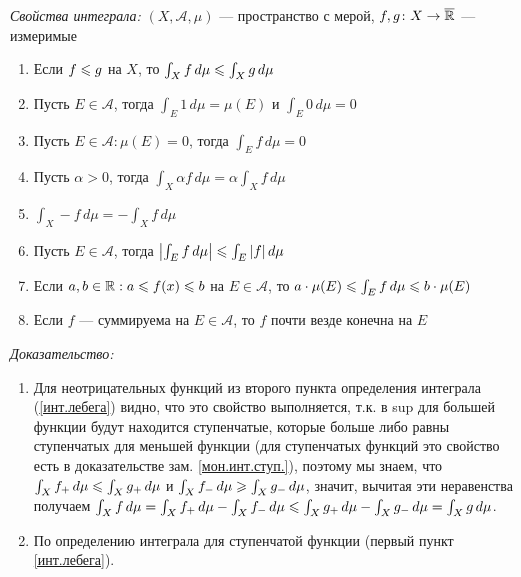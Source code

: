 \begin{zam}[https://www.youtube.com/live/fVyBKDoy3EM?si=LgENIvc4Pq6wo4Vq&t=7600] \textit{Свойства интеграла:} $(X, \mathcal A, \mu)$ --- пространство с мерой, $f, g\colon X \to \overline{\mathbb R}$ --- измеримые\
\begin{enumerate}\makeatletter\renewcommand{\p@enumi}{\thezam.}\makeatother
	\item\label{мон.инт.} Если $f \leqslant g$ на $X$, то $\int_X f \, d\mu \leqslant \int_X g \, d\mu$
	
	\item Пусть $E \in \mathcal A$, тогда $\int_E 1 \, d\mu = \mu(E)$ и $\int_E 0 \, d\mu = 0$
	
	\item Пусть $E \in \mathcal A : \mu(E) = 0$, тогда $\int_E f \, d\mu = 0$
	
	\item Пусть $\alpha > 0$, тогда $\int_X \alpha f \, d\mu = \alpha \int_X f \, d\mu$
	
	\item $\int_X -f \, d\mu = -\int_X f \, d\mu$
	
	\item Пусть $E \in \mathcal A$, тогда $\left| \int_E f \, d\mu \right| \leqslant \int_E |f| \, d\mu$
	
	\item Если $a, b \in \mathbb R : a \leqslant f(x) \leqslant b$ на $E \in \mathcal A$, то $a \cdot \mu(E) \leqslant \int_E f \, d\mu \leqslant b \cdot \mu(E)$
	
	\item\label{сумм.-п.в.кон.} Если $f$ --- суммируема на $E \in \mathcal A$, то $f$ почти везде конечна на $E$
\end{enumerate}
\textit{Доказательство:}
\begin{enumerate}
	\item Для неотрицательных функций из второго пункта определения интеграла (\ref{инт.лебега}) видно, что это свойство выполняется, т.к. в sup для большей функции будут находится ступенчатые, которые больше либо равны ступенчатых для меньшей функции (для ступенчатых функций это свойство есть в доказательстве зам. \ref{мон.инт.ступ.}), поэтому мы знаем, что $\int_X f_+ \,d\mu \leqslant \int_X g_+\, d\mu$ и $\int_X f_- \,d\mu \geqslant \int_X g_-\, d\mu$, значит, вычитая эти неравенства получаем $\int_X f \, d\mu = \int_X f_+ \, d\mu - \int_X f_- \, d\mu \leqslant \int_X g_+ \, d\mu - \int_X g_- \, d\mu = \int_X g \, d\mu$.
	
	\item По определению интеграла для ступенчатой функции (первый пункт \ref{инт.лебега}).
	

\end{enumerate}
\end{zam}
